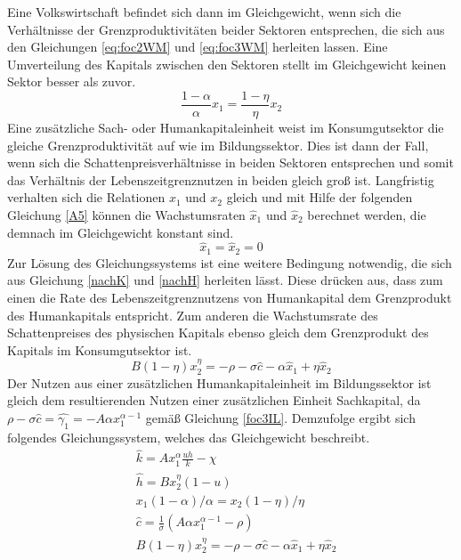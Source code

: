 Eine Volkswirtschaft befindet sich dann im Gleichgewicht, wenn sich die Verhältnisse der Grenzproduktivitäten beider Sektoren entsprechen, die sich aus den Gleichungen \eqref{eq:foc2WM} und \eqref{eq:foc3WM} herleiten lassen. Eine Umverteilung des Kapitals zwischen den Sektoren stellt im Gleichgewicht keinen Sektor besser als zuvor. 
\begin{equation}
\boxed{\frac{1-\alpha}{\alpha}x_1=\frac{1-\eta}{\eta}x_2}
\end{equation}
Eine zusätzliche Sach- oder Humankapitaleinheit weist im Konsumgutsektor die gleiche Grenzproduktivität auf wie im Bildungssektor. Dies ist dann der Fall, wenn sich die Schattenpreisverhältnisse in beiden Sektoren entsprechen und somit das Verhältnis der Lebenszeitgrenznutzen in beiden gleich gro{\ss} ist. Langfristig verhalten sich die Relationen $x_1$ und $x_2$ gleich und mit Hilfe der folgenden Gleichung \eqref{A5} können die Wachstumsraten $\hat{x}_1$ und $\hat{x}_2$ berechnet werden, die demnach im Gleichgewicht konstant sind. 
\begin{equation}
\hat{x}_1=\hat{x}_2=0
\end{equation}
Zur Lösung des Gleichungssystems ist eine weitere Bedingung notwendig, die sich aus Gleichung \eqref{nachK} und \eqref{nachH} herleiten lässt. Diese drücken aus, dass zum einen die Rate des Lebenszeitgrenznutzens von Humankapital dem Grenzprodukt des Humankapitals entspricht. Zum anderen die Wachstumsrate des Schattenpreises des physischen Kapitals ebenso gleich dem Grenzprodukt des Kapitals im Konsumgutsektor ist. 
\begin{equation}
\boxed{B(1-\eta)x_2^\eta=-\rho-\sigma\hat{c}-\alpha\hat{x}_1+\eta\hat{x}_2}\label{A5}
\end{equation}
Der Nutzen aus einer zusätzlichen Humankapitaleinheit im Bildungssektor ist gleich dem resultierenden Nutzen einer zusätzlichen Einheit Sachkapital, da $\rho-\sigma\hat{c}=\hat{\gamma_1}=-A\alpha x_1^{\alpha-1}$ gemä{\ss} Gleichung \eqref{foc3IL}.
Demzufolge ergibt sich folgendes Gleichungssystem, welches das Gleichgewicht beschreibt. 
\begin{align}
&\hat{k}=Ax_1^\alpha \frac{uh}{k}-\chi\label{GG1WM}\\
&\hat{h}=Bx_2^\eta(1-u)\label{GG2WM}\\
& x_1(1-\alpha)/\alpha =x_2(1-\eta)/\eta\label{GG3WM}\\
&\hat{c}=\frac{1}{\sigma}\left(A\alpha x_1^{\alpha -1}-\rho\right)\label{GG4WM}\\
&B(1-\eta)x_2^\eta=-\rho-\sigma\hat{c}-\alpha\hat{x}_1+\eta\hat{x}_2\label{GG5WM}
\end{align}
